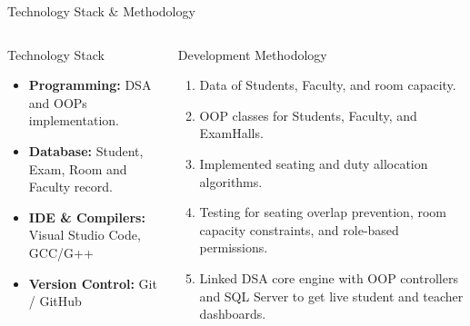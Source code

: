 \documentclass[aspectratio=169,11pt]{beamer}
\begin{document}
\begin{frame}{Technology Stack \& Methodology}
\begin{columns}[T,totalwidth=\textwidth]
\begin{block}{Technology Stack}
\begin{itemize}\itemsep2pt
\item \textbf{Programming:} DSA and OOPs implementation.
\item \textbf{Database:} Student, Exam, Room and Faculty record.
\item \textbf{IDE \& Compilers:} Visual Studio Code, GCC/G++
\item \textbf{Version Control:} Git / GitHub
\end{itemize}
\end{block}
\begin{block}{Development Methodology}
\begin{enumerate}\itemsep2pt
\item Data of Students, Faculty, and room capacity.
\item OOP  classes for Students, Faculty, and ExamHalls.
\item Implemented seating and duty allocation algorithms.
\item Testing for seating overlap prevention, room capacity constraints, and role-based permissions.
\item Linked DSA core engine with OOP controllers and SQL Server to get live student and teacher dashboards.
\end{enumerate}
\end{block}
\end{columns}
\vfill
\end{frame}
\end{document}
